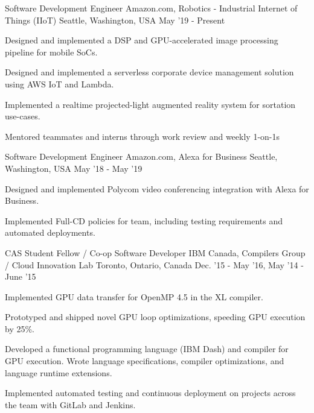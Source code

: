 \begin{cventries}
\cventry
    {Software Development Engineer} %
    {Amazon.com, Robotics - Industrial Internet of Things (IIoT)} %
    {Seattle, Washington, USA} %
    {May '19 - Present} %
    {
        \begin{cvitems}
            \item Designed and implemented a DSP and GPU-accelerated image processing pipeline for mobile SoCs.
            \item Designed and implemented a serverless corporate device management solution using AWS IoT and Lambda.
            \item Implemented a realtime projected-light augmented reality system for sortation use-cases.
            \item Mentored teammates and interns through work review and weekly 1-on-1s
        \end{cvitems}
    }
\vspace{3mm}
\cventry
    {Software Development Engineer} %
    {Amazon.com, Alexa for Business} %
    {Seattle, Washington, USA} %
    {May '18 - May '19} %
    {
        \begin{cvitems}
            \item Designed and implemented Polycom video conferencing integration with Alexa for Business.
            \item Implemented Full-CD policies for team, including testing requirements and automated deployments.
        \end{cvitems}
    }
\vspace{3mm}
\cventry
    {CAS Student Fellow / Co-op Software Developer} %
    {IBM Canada, Compilers Group / Cloud Innovation Lab} %
    {Toronto, Ontario, Canada} %
    {Dec. '15 - May '16, May '14 - June '15} %
    {
        \begin{cvitems}
            \item Implemented GPU data transfer for OpenMP 4.5 in the XL compiler.
            \item Prototyped and shipped novel GPU loop optimizations, speeding GPU execution by 25\%.
            \item Developed a functional programming language (IBM Dash) and compiler for GPU execution. Wrote language specifications, compiler optimizations, and language runtime extensions.
            \item Implemented automated testing and continuous deployment on projects across the team with GitLab and Jenkins.

\end{cvitems}}
\end{cventries}
